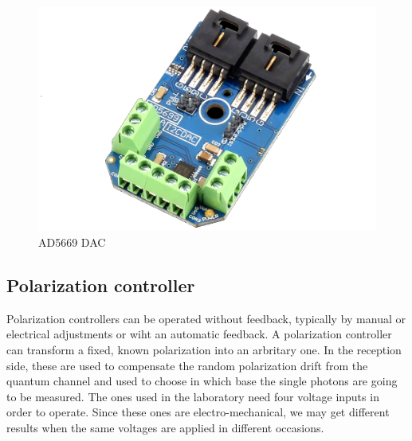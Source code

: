 \begin{refsection}
		\begin{figure}[H]
		
		\centering
		\includegraphics[width=0.6\linewidth]{./sdf/arduino_quantum_rx/figures/dac2.png}
		\caption{AD5669 DAC}
		\label{fig:netxpto}
		
	\end{figure}

	\subsection{Polarization controller}
	Polarization controllers can be operated without feedback, typically by manual or electrical adjustments or wiht an automatic feedback. A polarization controller can transform a fixed, known polarization into an arbritary one. In the reception side, these are used to compensate the random polarization drift from the quantum channel and used to choose in which base the single photons are going to be measured. The ones used in the laboratory need four voltage inputs in order to operate. Since these ones are electro-mechanical, we may get different results when the same voltages are applied in different occasions. 
	
	

\end{refsection}
